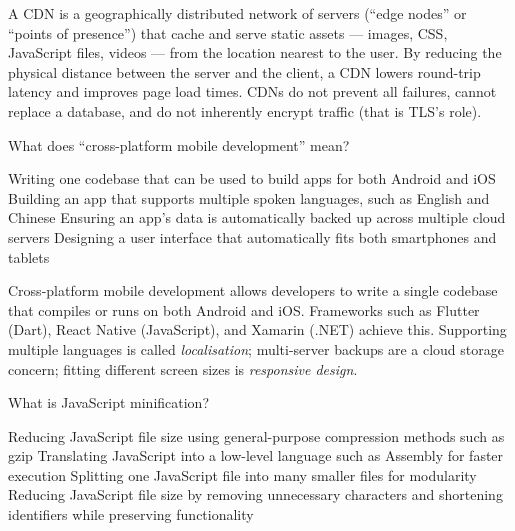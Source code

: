 \documentclass[answers]{exam}
\begin{document}
\begin{questions}
\begin{solution}
    A CDN is a geographically distributed network of servers (``edge nodes'' or ``points of presence'') that cache and serve static assets --- images, CSS, JavaScript files, videos --- from the location nearest to the user.
    By reducing the physical distance between the server and the client, a CDN lowers round-trip latency and improves page load times.
    CDNs do not prevent all failures, cannot replace a database, and do not inherently encrypt traffic (that is TLS's role).
\end{solution}

\question What does ``cross-platform mobile development'' mean?

\begin{choices}
    \correctchoice Writing one codebase that can be used to build apps for both Android and iOS
    \choice Building an app that supports multiple spoken languages, such as English and Chinese
    \choice Ensuring an app's data is automatically backed up across multiple cloud servers
    \choice Designing a user interface that automatically fits both smartphones and tablets
\end{choices}

\begin{solution}
    Cross-platform mobile development allows developers to write a single codebase that compiles or runs on both Android and iOS.
    Frameworks such as Flutter (Dart), React Native (JavaScript), and Xamarin (.NET) achieve this.
    Supporting multiple languages is called \textit{localisation}; multi-server backups are a cloud storage concern; fitting different screen sizes is \textit{responsive design}.
\end{solution}

\question What is JavaScript minification?

\begin{choices}
    \choice Reducing JavaScript file size using general-purpose compression methods such as gzip
    \choice Translating JavaScript into a low-level language such as Assembly for faster execution
    \choice Splitting one JavaScript file into many smaller files for modularity
    \correctchoice Reducing JavaScript file size by removing unnecessary characters and shortening identifiers while preserving functionality
\end{choices}


\end{questions}
\end{document}

